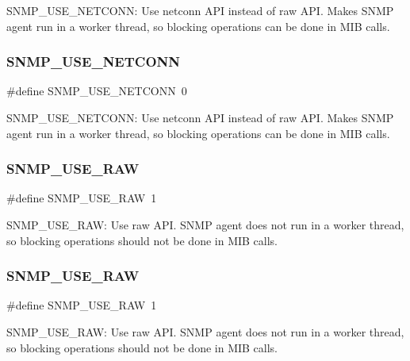 S\+N\+M\+P\+\_\+\+U\+S\+E\+\_\+\+N\+E\+T\+C\+O\+NN\+: Use netconn A\+PI instead of raw A\+PI. Makes S\+N\+MP agent run in a worker thread, so blocking operations can be done in M\+IB calls. \mbox{\label{group__snmp__opts_gaf02e8b4b69e99df784e9953401477078}} 
\subsubsection{\texorpdfstring{S\+N\+M\+P\+\_\+\+U\+S\+E\+\_\+\+N\+E\+T\+C\+O\+NN}{SNMP\_USE\_NETCONN}\hspace{0.1cm}{\footnotesize\ttfamily [2/2]}}
{\footnotesize\ttfamily \#define S\+N\+M\+P\+\_\+\+U\+S\+E\+\_\+\+N\+E\+T\+C\+O\+NN~0}

S\+N\+M\+P\+\_\+\+U\+S\+E\+\_\+\+N\+E\+T\+C\+O\+NN\+: Use netconn A\+PI instead of raw A\+PI. Makes S\+N\+MP agent run in a worker thread, so blocking operations can be done in M\+IB calls. \mbox{\label{group__snmp__opts_ga8c93f4260af2eb3c50d4bc603f716f1f}} 
\subsubsection{\texorpdfstring{S\+N\+M\+P\+\_\+\+U\+S\+E\+\_\+\+R\+AW}{SNMP\_USE\_RAW}\hspace{0.1cm}{\footnotesize\ttfamily [1/2]}}
{\footnotesize\ttfamily \#define S\+N\+M\+P\+\_\+\+U\+S\+E\+\_\+\+R\+AW~1}

S\+N\+M\+P\+\_\+\+U\+S\+E\+\_\+\+R\+AW\+: Use raw A\+PI. S\+N\+MP agent does not run in a worker thread, so blocking operations should not be done in M\+IB calls. \mbox{\label{group__snmp__opts_ga8c93f4260af2eb3c50d4bc603f716f1f}} 
\subsubsection{\texorpdfstring{S\+N\+M\+P\+\_\+\+U\+S\+E\+\_\+\+R\+AW}{SNMP\_USE\_RAW}\hspace{0.1cm}{\footnotesize\ttfamily [2/2]}}
{\footnotesize\ttfamily \#define S\+N\+M\+P\+\_\+\+U\+S\+E\+\_\+\+R\+AW~1}

S\+N\+M\+P\+\_\+\+U\+S\+E\+\_\+\+R\+AW\+: Use raw A\+PI. S\+N\+MP agent does not run in a worker thread, so blocking operations should not be done in M\+IB calls. 